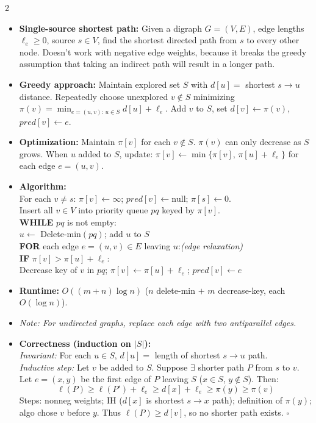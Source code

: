 \documentclass[9pt]{article}
\begin{document}
\begin{multicols}{2}
\begin{itemize}
  \item \textbf{Single-source shortest path:} Given a digraph $G=(V,E)$, edge lengths $\ell_e\ge0$, source $s\in V$, find the shortest directed path from $s$ to every other node. Doesn't work with negative edge weights, because it breaks the greedy assumption that taking an indirect path will result in a longer path.
  \item \textbf{Greedy approach:} Maintain explored set $S$ with $d[u]=$ shortest $s\to u$ distance. Repeatedly choose unexplored $v\not\in S$ minimizing $\pi(v)=\min_{e=(u,v):\,u\in S}d[u]+\ell_e$. Add $v$ to $S$, set $d[v]\leftarrow\pi(v)$, $pred[v]\leftarrow e$.
  \item \textbf{Optimization:} Maintain $\pi[v]$ for each $v\not\in S$. $\pi(v)$ can only decrease as $S$ grows. When $u$ added to $S$, update: $\pi[v]\leftarrow\min\{\pi[v],\,\pi[u]+\ell_e\}$ for each edge $e=(u,v)$.
  \item \textbf{Algorithm:}\\
  For each $v\ne s$: $\pi[v]\leftarrow\infty$;\; $pred[v]\leftarrow\mathrm{null}$;\; $\pi[s]\leftarrow0$.\\
  Insert all $v\in V$ into priority queue $pq$ keyed by $\pi[v]$.\\
  \textbf{WHILE} $pq$ is not empty:\\
  \hspace*{8pt}$u\leftarrow$ Delete-min$(pq)$;\; add $u$ to $S$\\
  \hspace*{8pt}\textbf{FOR} each edge $e=(u,v)\in E$ leaving $u$:\quad\textit{(edge relaxation)}\\
  \hspace*{16pt}\textbf{IF} $\pi[v]>\pi[u]+\ell_e$:\\
  \hspace*{24pt}Decrease key of $v$ in $pq$;\; $\pi[v]\leftarrow\pi[u]+\ell_e$;\; $pred[v]\leftarrow e$
  \item \textbf{Runtime:} $O((m+n)\log n)$ ($n$ delete-min $+$ $m$ decrease-key, each $O(\log n)$).
  \item \textit{Note: For undirected graphs, replace each edge with two antiparallel edges.}
  \item \textbf{Correctness (induction on $|S|$):}\\
  \textit{Invariant:} For each $u\in S$, $d[u]=$ length of shortest $s\to u$ path.\\
  \textit{Inductive step:} Let $v$ be added to $S$. Suppose $\exists$ shorter path $P$ from $s$ to $v$. Let $e=(x,y)$ be the first edge of $P$ leaving $S$ ($x\in S$, $y\not\in S$). Then:
  $$\ell(P)\ge\ell(P')+\ell_e\ge d[x]+\ell_e\ge\pi(y)\ge\pi(v)$$
  Steps: nonneg weights; IH ($d[x]$ is shortest $s\to x$ path); definition of $\pi(y)$; algo chose $v$ before $y$. Thus $\ell(P)\ge d[v]$, so no shorter path exists. $\square$
\end{itemize}


\end{multicols}
\end{document}
